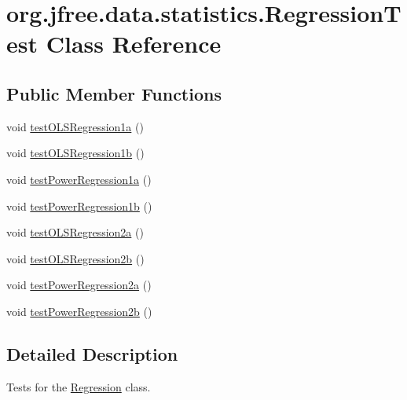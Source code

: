 \hypertarget{classorg_1_1jfree_1_1data_1_1statistics_1_1_regression_test}{}\section{org.\+jfree.\+data.\+statistics.\+Regression\+Test Class Reference}
\label{classorg_1_1jfree_1_1data_1_1statistics_1_1_regression_test}
\subsection*{Public Member Functions}
\begin{DoxyCompactItemize}
\item 
void \mbox{\hyperlink{classorg_1_1jfree_1_1data_1_1statistics_1_1_regression_test_a92df99dbf37147a4af020aaeca417cfc}{test\+O\+L\+S\+Regression1a}} ()
\item 
void \mbox{\hyperlink{classorg_1_1jfree_1_1data_1_1statistics_1_1_regression_test_a06236d384f62f6f01a61853b8cc2d086}{test\+O\+L\+S\+Regression1b}} ()
\item 
void \mbox{\hyperlink{classorg_1_1jfree_1_1data_1_1statistics_1_1_regression_test_a6e5d5e00d0ec21ad3aa78ddcfce35f58}{test\+Power\+Regression1a}} ()
\item 
void \mbox{\hyperlink{classorg_1_1jfree_1_1data_1_1statistics_1_1_regression_test_a4ffc410dd671f707d0b34182db737d40}{test\+Power\+Regression1b}} ()
\item 
void \mbox{\hyperlink{classorg_1_1jfree_1_1data_1_1statistics_1_1_regression_test_a2f4c09c7799345f24ffefd54f497a52b}{test\+O\+L\+S\+Regression2a}} ()
\item 
void \mbox{\hyperlink{classorg_1_1jfree_1_1data_1_1statistics_1_1_regression_test_addcf8da77ea07023b88c6500c444a90c}{test\+O\+L\+S\+Regression2b}} ()
\item 
void \mbox{\hyperlink{classorg_1_1jfree_1_1data_1_1statistics_1_1_regression_test_a057e4284740ab9a6ad96639f6e45abbd}{test\+Power\+Regression2a}} ()
\item 
void \mbox{\hyperlink{classorg_1_1jfree_1_1data_1_1statistics_1_1_regression_test_a74a5645e6f2a7db2fa2547f88cf3ecbe}{test\+Power\+Regression2b}} ()
\end{DoxyCompactItemize}


\subsection{Detailed Description}
Tests for the \mbox{\hyperlink{classorg_1_1jfree_1_1data_1_1statistics_1_1_regression}{Regression}} class. 

